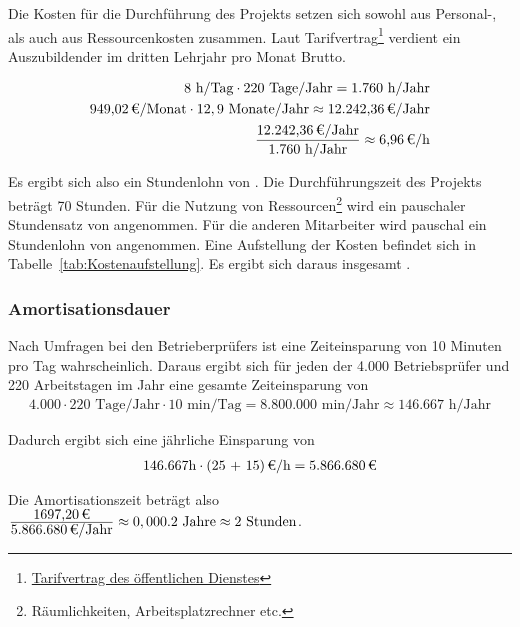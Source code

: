 Die Kosten für die Durchführung des Projekts setzen sich sowohl aus Personal-, als auch aus Ressourcenkosten zusammen.
Laut Tarifvertrag\footnote{\href{http://www.oeffentlichen-dienst.de/auszubildende/25-tarifvertrag-fuer-den-auszubildende/90-tvaoed-besonderer-teil-bbig.html}{Tarifvertrag des öffentlichen Dienstes}} verdient ein Auszubildender im dritten Lehrjahr pro Monat  Brutto. 

\begin{eqnarray}
8 \mbox{ h/Tag} \cdot 220 \mbox{ Tage/Jahr} = 1.760 \mbox{ h/Jahr}\\
\eur{949,02}\mbox{/Monat} \cdot 12,9 \mbox{ Monate/Jahr} \approx \eur{12.242,36} \mbox{/Jahr}\\
\frac{\eur{12.242,36} \mbox{/Jahr}}{1.760 \mbox{ h/Jahr}} \approx \eur{6,96}\mbox{/h}
\end{eqnarray}

Es ergibt sich also ein Stundenlohn von . 
Die Durchführungszeit des Projekts beträgt 70 Stunden. Für die Nutzung von Ressourcen\footnote{Räumlichkeiten, Arbeitsplatzrechner etc.} wird 
ein pauschaler Stundensatz von  angenommen. Für die anderen Mitarbeiter wird pauschal ein Stundenlohn von  angenommen. 
Eine Aufstellung der Kosten befindet sich in Tabelle~\ref{tab:Kostenaufstellung}. Es ergibt sich daraus insgesamt .


\subsubsection{Amortisationsdauer}
\label{sec:Amortisationsdauer}

Nach Umfragen bei den Betrieberprüfers ist eine Zeiteinsparung von 10 Minuten pro Tag wahrscheinlich. Daraus ergibt sich für jeden der 4.000 Betriebsprüfer und 220 Arbeitstagen im Jahr eine gesamte Zeiteinsparung von 
\begin{eqnarray}
4.000 \cdot 220 \mbox{ Tage/Jahr} \cdot 10 \mbox{ min/Tag} = 8.800.000 \mbox{ min/Jahr} \approx 146.667 \mbox{ h/Jahr} 
\end{eqnarray}

Dadurch ergibt sich eine jährliche Einsparung von 
\begin{eqnarray}
146.667 \mbox{h} \cdot \eur{(25 + 15)}{\mbox{/h}} = \eur{5.866.680}
\end{eqnarray}

Die Amortisationszeit beträgt also $\frac{\eur{1697,20}}{\eur{5.866.680}\mbox{/Jahr}} \approx 0,000.2 \mbox{ Jahre} \approx 2 \mbox{ Stunden}$.

